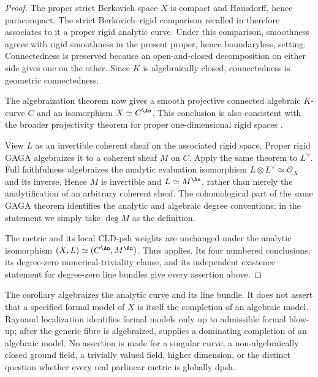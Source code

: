 
\begin{proof}
The proper strict Berkovich space \(X\) is compact and Hausdorff, hence
paracompact. The strict Berkovich--rigid comparison recalled in
\cite[\S2.2]{GM19} therefore associates to it a proper rigid analytic
curve. Under this comparison, smoothness agrees with rigid smoothness in
the present proper, hence boundaryless, setting. Connectedness is preserved
because an open-and-closed decomposition on either side gives one on the
other. Since \(K\) is algebraically closed, connectedness is geometric
connectedness.

The algebraization theorem
\cite[Theorem~1.8.1(a)]{Lutkebohmert2016RigidCurves} now gives a smooth
projective connected algebraic \(K\)-curve \(C\) and an isomorphism
\(X\simeq C^{\An}\). This conclusion is also consistent with the broader
projectivity theorem for proper one-dimensional rigid spaces
\cite[Theorem~8.12]{Mitsui2011RigidSurfaces}.

View \(L\) as an invertible coherent sheaf on the associated rigid space.
Proper rigid GAGA
\cite[Theorem~1.6.11(b),(c)]{Lutkebohmert2016RigidCurves}
algebraizes it to a coherent sheaf \(M\) on \(C\). Apply the same theorem to
\(L^\vee\). Full faithfulness algebraizes the analytic evaluation
isomorphism \(L\otimes L^\vee\simeq\mathcal O_X\) and its inverse. Hence
\(M\) is invertible and \(L\simeq M^{\An}\), rather than merely the
analytification of an arbitrary coherent sheaf. The cohomological part of
the same GAGA theorem identifies the analytic and algebraic degree
conventions; in the statement we simply take \(\deg M\) as the definition.

The metric and its local CLD-psh weights are unchanged under the analytic
isomorphism \((X,L)\simeq(C^{\An},M^{\An})\). Thus
 applies. Its four numbered conclusions,
its degree-zero numerical-triviality clause, and its independent existence
statement for degree-zero line bundles give every assertion above.
\end{proof}

\begin{remark}
\label{rem:p082-smooth-strict-curve-transfer-scope}
The corollary algebraizes the analytic curve and its line bundle. It does
not assert that a specified formal model of \(X\) is itself the completion
of an algebraic model. Raynaud localization identifies formal models only
up to admissible formal blow-up; after the generic fibre is algebraized,
\cite[Lemma~2.4]{GM19} supplies a dominating completion of an algebraic
model. No assertion is made for a singular curve, a non-algebraically
closed ground field, a trivially valued field, higher dimension, or the
distinct question whether every real parlinear metric is globally dpsh.
\end{remark}
